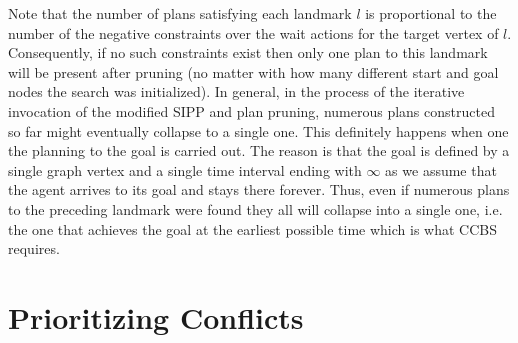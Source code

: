 \documentclass[letterpaper]{article} %
\newcommand\konstantin[1]{\nb{\textbf{Konstantin:}}{red}{#1}}
\newcommand\roni[1]{\nb{\textbf{Roni:}}{orange}{#1}}
\newcommand{\ccbs}{\ac{CCBS}\xspace}
\newcommand{\cbsds}{{CBS-DS}\xspace}
\newcommand{\sipp}{\ac{SIPP}\xspace}
\begin{document}
Note that the number of plans satisfying each landmark $l$ is proportional to the number of the negative constraints over the wait actions for the target vertex of $l$. 
Consequently, if no such constraints exist then only one plan to this landmark will be present after pruning (no matter with how many different start and goal nodes the search was initialized). 
In general, in the process of the iterative invocation of the modified \sipp and plan pruning, numerous plans constructed so far might eventually collapse to a single one. This definitely happens when one the planning to the goal is carried out. The reason is that the goal is defined by a single graph vertex and a single time interval ending with $\infty$ as we assume that the agent arrives to its goal and stays there forever. Thus, even if numerous plans to the preceding landmark were found they all will collapse into a single one, i.e. the one that achieves the goal at the earliest possible time which is what \ccbs requires.
 






\section{Prioritizing Conflicts}



\end{document}
